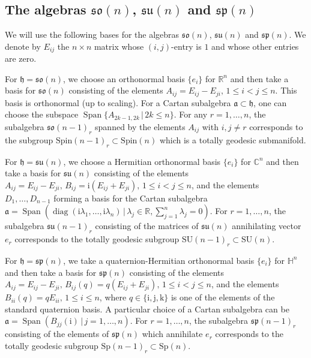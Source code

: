 \documentclass[12pt,reqno]{amsart}
\newcommand \la{\lambda}
\newcommand \br{\mathbb{R}}
\newcommand \bc{\mathbb{C}}
\newcommand \bh{\mathbb{H}}
\newcommand \Span{\operatorname{Span}}
\newcommand \Sp{\mathrm{Sp}}
\newcommand \SU{\mathrm{SU}}
\newcommand \Spin{\mathrm{Spin}}
\newcommand\ag{\mathfrak a}
\newcommand\h{\mathfrak h}
\newcommand \so{\mathfrak{so}}
\newcommand \spg{\mathfrak{sp}}
\newcommand \su{\mathfrak{su}}
\newcommand \ir{\mathrm{i}}
\newcommand \jr{\mathrm{j}}
\newcommand \kr{\mathrm{k}}
\newcommand \diag{\operatorname{diag}}
\newcommand \<{\langle}
\renewcommand \>{\rangle}
\theoremstyle{definition}
\theoremstyle{remark}
\begin{document}
	\subsection{The algebras \texorpdfstring{$\so(n)$, $\su(n)$ and $\spg(n)$}{so(n), su(n) and sp(n)}}
	\label{ss:algebras}
	
	We will use the following bases for the algebras $\so(n)$, $\su(n)$ and $\spg(n)$. We denote by $E_{ij}$ the $n \times n$ matrix whose $(i,j)$-entry is $1$ and whose other entries are zero.
	
	For $\h = \so(n)$, we choose an orthonormal basis $\{e_i\}$ for $\br^n$ and then take a basis for $\so(n)$ consisting of the elements $A_{ij} = E_{ij} - E_{ji}, \, 1 \le i < j\le n$. This basis is orthonormal (up to scaling). For a Cartan subalgebra $\ag \subset \h$, one can choose the subspace $\Span\{A_{2k-1,2k} \, | \, 2k \le n\}$. For any $r=1, \dots, n$, the subalgebra $\so(n-1)_r$ spanned by the elements $A_{ij}$ with $i,j \ne r$ corresponds to the subgroup $\Spin(n-1)_r \subset \Spin(n)$ which is a totally geodesic submanifold.
	
	For $\h = \su(n)$, we choose a Hermitian orthonormal basis $\{e_i\}$ for $\bc^n$ and then take a basis for $\su(n)$ consisting of the elements $A_{ij} = E_{ij} - E_{ji}, \, B_{ij} = \ir (E_{ij} + E_{ji}), \, 1 \le i < j\le n$, and the elements $D_1, \dots, D_{n-1}$ forming a basis for the Cartan subalgebra $\ag = \Span(\diag(\ir \la_1, \dots, \ir \la_n) \, | \, \la_j \in \br, \sum_{j=1}^{n} \la_j = 0)$. For $r=1, \dots, n$, the subalgebra $\su(n-1)_r$ consisting of the matrices of $\su(n)$ annihilating vector $e_r$ corresponds to the totally geodesic subgroup $\SU(n-1)_r \subset \SU(n)$.
	
	For $\h = \spg(n)$, we take a quaternion-Hermitian orthonormal basis $\{e_i\}$ for $\bh^n$ and then take a basis for $\spg(n)$ consisting of the elements $A_{ij} = E_{ij} - E_{ji}, \, B_{ij}(q) = q (E_{ij} + E_{ji}), \, 1 \le i < j \le n$, and the elements $B_{ii}(q) = q E_{ii}, \, 1 \le i \le n$, where $q \in \{\ir,\jr,\kr\}$ is one of the elements of the standard quaternion basis. A particular choice of a Cartan subalgebra can be $\ag = \Span(B_{jj}(\ir) \, | \, j =  1, \dots, n)$. For $r=1, \dots, n$, the subalgebra $\spg(n-1)_r$ consisting of the elements of $\spg(n)$ which annihilate $e_r$ corresponds to the totally geodesic subgroup $\Sp(n-1)_r \subset \Sp(n)$.
	
\end{document}
